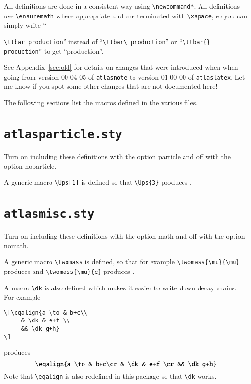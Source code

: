\documentclass[koma,UKenglish]{latex/atlasdoc}
\newcommand{\File}[1]{\texttt{#1}\xspace}
\newcommand{\Macro}[1]{\texttt{\textbackslash #1}\xspace}
\newcommand{\Option}[1]{\textsf{#1}\xspace}
\newcommand{\Package}[1]{\texttt{#1}\xspace}
\begin{document}
All definitions are done in a consistent way using \verb|\newcommand*|.
All definitions use \verb|\ensuremath| where appropriate and are terminated with
\verb|\xspace|, so you can simply write ``{\verb|\ttbar production|'' instead of
``\verb|\ttbar\ production|'' or ``\verb|\ttbar{} production|'' to get \enquote{\ttbar production}.

See Appendix~\ref{sec:old} for details on changes that were introduced when
when going from version 00-04-05 of \Package{atlasnote}
to version 01-00-00 of \Package{atlaslatex}.
Let me know if you spot some other changes that are not documented here!

The following sections list the macros defined in the various files.

\twocolumn
\section{\File{atlasparticle.sty}}

Turn on including these definitions with the option \Option{particle} and off with the option \Option{noparticle}.



A generic macro \verb|\Ups[1]| is defined so that \verb|\Ups{3}| produces .


\newpage
\section{\File{atlasmisc.sty}}

Turn on including these definitions with the option \Option{math} and off with the option \Option{nomath}.



\noindent A generic macro \verb|\twomass| is defined, so that for example
\verb|\twomass{\mu}{\mu}| produces \twomass{\mu}{\mu} and \verb|\twomass{\mu}{e}| produces .

A macro \verb|\dk| is also defined which makes it easier to write down decay chains.
For example
\begin{verbatim}
\[\eqalign{a \to & b+c\\
	 & \dk & e+f \\
	 && \dk g+h}
\]
\end{verbatim}
produces
\[\eqalign{a \to & b+c\cr
	 & \dk & e+f \cr
	 && \dk g+h}
\]
Note that \Macro{eqalign} is also redefined in this package so that \Macro{dk} works.


}
\end{document}
